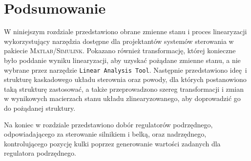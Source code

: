 \section{Podsumowanie}

W niniejszym rozdziale przedstawiono obrane zmienne stanu i proces linearyzacji wykorzystujący narzędzia dostępne dla projektantów systemów sterowania w pakiecie \textsc{Matlab/Simulink}. Pokazano również transformację, której konieczne było poddanie wyniku linearyzacji, aby uzyskać pożądane zmienne stanu, a nie wybrane przez narzędzie \texttt{Linear Analysis Tool}. Następnie przedstawiono ideę i strukturę kaskadowego układu sterownia oraz powody, dla których postanowiono taką strukturę zastosować, a także przeprowadzono szereg transformacji i zmian w wynikowych macierzach stanu układu zlinearyzowanego, aby doprowadzić go do pożądanej struktury.

Na koniec w rozdziale przedstawiono dobór regulatorów podrzędnego, odpowiadającego za sterowanie silnikiem i belką, oraz nadrzędnego, kontrolującego pozycję kulki poprzez generowanie wartości zadanych dla regulatora podrzędnego.

